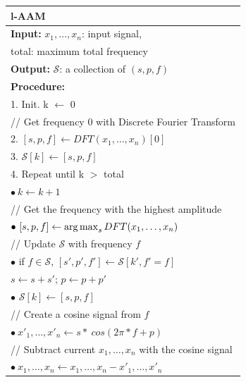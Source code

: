 \begin{figure}[t!]
	\begin{center}
		\begin{tabular*}{0.5\textwidth}{l @{\extracolsep{\fill}}}
			\hline
			\textbf{l-AAM} \textrm{\cite{jovan_iros16}} \\
			\hline
			\textbf{Input:} $x_1, \ldots, x_n$: input signal, \\
			\hspace{0.3cm} total: maximum total frequency \\
			\textbf{Output:} $\mathcal S$: a collection of $(s, p, f)$ \\
			\textbf{Procedure:}\\
			\hspace{0.3cm} 1. Init. k $\leftarrow$ 0 \\
			\hspace{0.3cm} // Get frequency $0$ with Discrete Fourier Transform \\
			\hspace{0.3cm} 2. $[s, p, f] \leftarrow DFT(x_1, \ldots, x_n)[0]$\\
			\hspace{0.3cm} 3. $\mathcal S[k] \leftarrow [s, p, f]$ \\
			\hspace{0.3cm} 4. Repeat until k $>$ total \\
			\hspace{0.7cm} $\bullet ~ k \leftarrow k + 1$ \\
			\hspace{0.7cm} // Get the frequency with the highest amplitude \\
			\hspace{0.7cm} $\bullet ~ [s, p, f] \leftarrow \operatorname*{arg\,max}_s DFT(x_1, \ldots, x_n)$ \\
			\hspace{0.7cm} // Update $\mathcal S$ with frequency $f$ \\
			\hspace{0.7cm} $\bullet$ if $f \in \mathcal S$, $[s', p', f'] \leftarrow \mathcal S[k', f'=f]$ \\
			\hspace{2.5cm} $s \leftarrow s + s'$; $p \leftarrow p + p'$ \\ 
			\hspace{0.7cm} $\bullet$ $\mathcal S[k] \leftarrow [s, p, f]$ \\
			\hspace{0.7cm} // Create a cosine signal from $f$ \\
			\hspace{0.7cm} $\bullet ~ x'_1, \ldots, x'_n \leftarrow s * ~ cos(2 \pi * f + p)$ \\
			\hspace{0.7cm} // Subtract current $x_1, \ldots, x_n$ with the cosine signal \\
			\hspace{0.7cm} $\bullet ~ x_1, \ldots, x_n \leftarrow x_1, \ldots, x_n - x'_1, \ldots, x'_n$ \\
			\hline
		\end{tabular*}	
	\end{center}
\end{figure}

